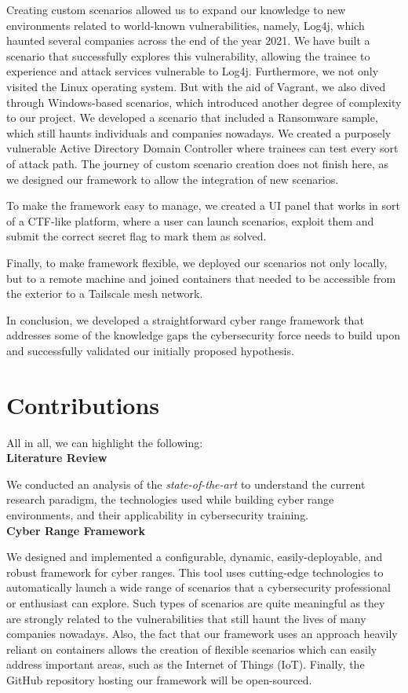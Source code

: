 Creating custom scenarios allowed us to expand our knowledge to new environments related to world-known vulnerabilities, namely, Log4j, which haunted several companies across the end of the year 2021. We have built a scenario that successfully explores this vulnerability, allowing the trainee to experience and attack services vulnerable to Log4j. Furthermore, we not only visited the Linux operating system. But with the aid of Vagrant, we also dived through Windows-based scenarios, which introduced another degree of complexity to our project. We developed a scenario that included a Ransomware sample, which still haunts individuals and companies nowadays. We created a purposely vulnerable Active Directory Domain Controller where trainees can test every sort of attack path. The journey of custom scenario creation does not finish here, as we designed our framework to allow the integration of new scenarios. 

To make the framework easy to manage, we created a UI panel that works in sort of a CTF-like platform, where a user can launch scenarios, exploit them and submit the correct secret flag to mark them as solved. 

Finally, to make framework flexible, we deployed our scenarios not only locally, but to a remote machine and joined containers that needed to be accessible from the exterior to a Tailscale mesh network.

In conclusion, we developed a straightforward cyber range framework that addresses some of the knowledge gaps the cybersecurity force needs to build upon and successfully validated our initially proposed hypothesis. 

\section{Contributions} \label{sec:contributions}

All in all, we can highlight the following:\\

\textbf{Literature Review}

We conducted an analysis of the \textit{state-of-the-art} to understand the current research paradigm, the technologies used while building cyber range environments, and their applicability in cybersecurity training.\\

\textbf{Cyber Range Framework}

We designed and implemented a configurable, dynamic, easily-deployable, and robust framework for cyber ranges. This tool uses cutting-edge technologies to automatically launch a wide range of scenarios that a cybersecurity professional or enthusiast can explore. Such types of scenarios are quite meaningful as they are strongly related to the vulnerabilities that still haunt the lives of many companies nowadays. Also, the fact that our framework uses an approach heavily reliant on containers allows the creation of flexible scenarios which can easily address important areas, such as the Internet of Things (IoT). Finally, the GitHub repository hosting our framework will be open-sourced.\\

